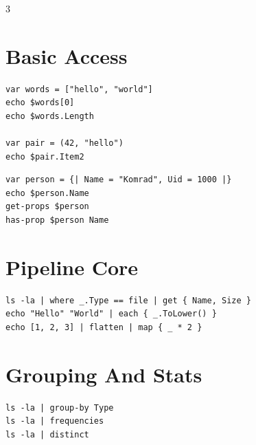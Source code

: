 \begin{multicols*}{3}
\section{Basic Access}
\begin{lstlisting}
var words = ["hello", "world"]
echo $words[0]
echo $words.Length

var pair = (42, "hello")
echo $pair.Item2
\end{lstlisting}

\begin{lstlisting}
var person = {| Name = "Komrad", Uid = 1000 |}
echo $person.Name
get-props $person
has-prop $person Name
\end{lstlisting}

\columnbreak

\section{Pipeline Core}

\begin{lstlisting}
ls -la | where _.Type == file | get { Name, Size }
echo "Hello" "World" | each { _.ToLower() }
echo [1, 2, 3] | flatten | map { _ * 2 }
\end{lstlisting}


\section{Grouping And Stats}
\begin{lstlisting}
ls -la | group-by Type
ls -la | frequencies
ls -la | distinct
\end{lstlisting}


\end{multicols*}
